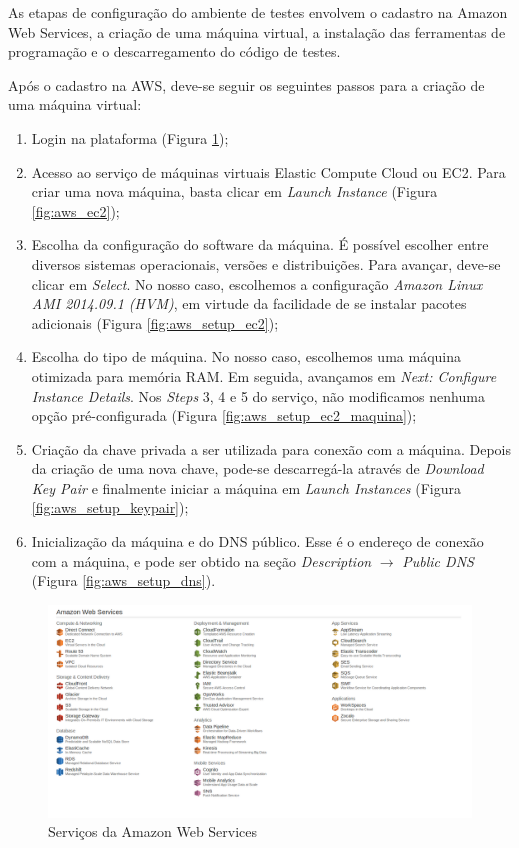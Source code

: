As etapas de configuração do ambiente de testes envolvem o cadastro na Amazon Web Services, a criação de uma máquina virtual, a instalação das ferramentas de programação e o descarregamento do código de testes.

Após o cadastro na AWS, deve-se seguir os seguintes passos para a criação de uma máquina virtual:

\begin{enumerate}
\item Login na plataforma (Figura \ref{fig:aws_servicos});
\item Acesso ao serviço de máquinas virtuais Elastic Compute Cloud ou EC2. Para criar uma nova máquina, basta clicar em \textit{Launch Instance} (Figura \ref{fig:aws_ec2});
\item Escolha da configuração do software da máquina. É possível escolher entre diversos sistemas operacionais, versões e distribuições. Para avançar, deve-se clicar em \textit{Select}. No nosso caso, escolhemos a configuração \textit{Amazon Linux AMI 2014.09.1 (HVM)}, em virtude da facilidade de se instalar pacotes adicionais  (Figura \ref{fig:aws_setup_ec2});
\item Escolha do tipo de máquina. No nosso caso, escolhemos uma máquina otimizada para memória RAM. Em seguida, avançamos em \textit{Next: Configure Instance Details}. Nos \textit{Steps} 3, 4 e 5 do serviço, não modificamos nenhuma opção pré-configurada (Figura \ref{fig:aws_setup_ec2_maquina});
\item Criação da chave privada a ser utilizada para conexão com a máquina. Depois da criação de uma nova chave, pode-se descarregá-la através de \textit{Download Key Pair} e finalmente iniciar a máquina em \textit{Launch Instances} (Figura \ref{fig:aws_setup_keypair});
\item Inicialização da máquina e do DNS público. Esse é o endereço de conexão com a máquina, e pode ser obtido na seção \textit{Description} $\rightarrow$ \textit{Public DNS} (Figura \ref{fig:aws_setup_dns}).
\end{enumerate}

\begin{figure}[htp]
    \begin{center}
    \includegraphics[width=1\textwidth]{img/aws_servicos}
    \end{center}
    \caption{Serviços da Amazon Web Services}
    \label{fig:aws_servicos}
\end{figure}

